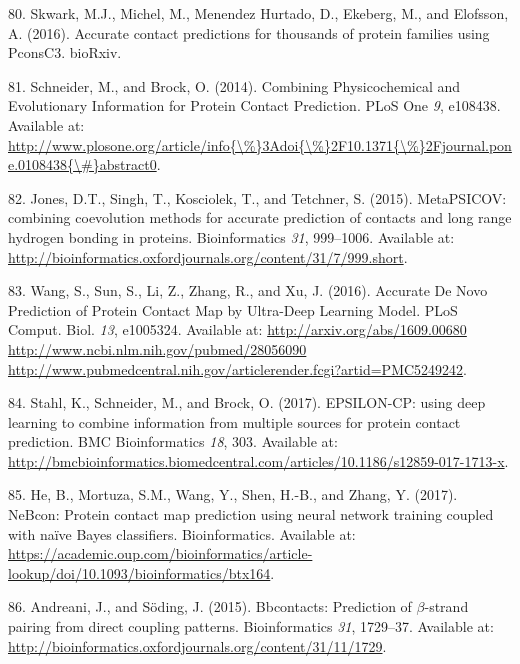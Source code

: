 \documentclass[11pt,a4paper,twoside]{book}
\theoremstyle{definition}
\theoremstyle{definition}
\theoremstyle{remark}
\begin{document}
\hypertarget{ref-Skwark2016}{}
80. Skwark, M.J., Michel, M., Menendez Hurtado, D., Ekeberg, M., and
Elofsson, A. (2016). Accurate contact predictions for thousands of
protein families using PconsC3. bioRxiv.

\hypertarget{ref-Schneider2014}{}
81. Schneider, M., and Brock, O. (2014). Combining Physicochemical and
Evolutionary Information for Protein Contact Prediction. PLoS One
\emph{9}, e108438. Available at:
\href{http://www.plosone.org/article/info\%7B/\%\%7D3Adoi\%7B/\%\%7D2F10.1371\%7B/\%\%7D2Fjournal.pone.0108438\%7B/\#\%7Dabstract0}{http://www.plosone.org/article/info\{\textbackslash{}\%\}3Adoi\{\textbackslash{}\%\}2F10.1371\{\textbackslash{}\%\}2Fjournal.pone.0108438\{\textbackslash{}\#\}abstract0}.

\hypertarget{ref-Jones2015a}{}
82. Jones, D.T., Singh, T., Kosciolek, T., and Tetchner, S. (2015).
MetaPSICOV: combining coevolution methods for accurate prediction of
contacts and long range hydrogen bonding in proteins. Bioinformatics
\emph{31}, 999--1006. Available at:
\url{http://bioinformatics.oxfordjournals.org/content/31/7/999.short}.

\hypertarget{ref-Wang2016a}{}
83. Wang, S., Sun, S., Li, Z., Zhang, R., and Xu, J. (2016). Accurate De
Novo Prediction of Protein Contact Map by Ultra-Deep Learning Model.
PLoS Comput. Biol. \emph{13}, e1005324. Available at:
\href{http://arxiv.org/abs/1609.00680\%20http://www.ncbi.nlm.nih.gov/pubmed/28056090\%20http://www.pubmedcentral.nih.gov/articlerender.fcgi?artid=PMC5249242}{http://arxiv.org/abs/1609.00680 http://www.ncbi.nlm.nih.gov/pubmed/28056090 http://www.pubmedcentral.nih.gov/articlerender.fcgi?artid=PMC5249242}.

\hypertarget{ref-Stahl2017}{}
84. Stahl, K., Schneider, M., and Brock, O. (2017). EPSILON-CP: using
deep learning to combine information from multiple sources for protein
contact prediction. BMC Bioinformatics \emph{18}, 303. Available at:
\url{http://bmcbioinformatics.biomedcentral.com/articles/10.1186/s12859-017-1713-x}.

\hypertarget{ref-He2017}{}
85. He, B., Mortuza, S.M., Wang, Y., Shen, H.-B., and Zhang, Y. (2017).
NeBcon: Protein contact map prediction using neural network training
coupled with naïve Bayes classifiers. Bioinformatics. Available at:
\url{https://academic.oup.com/bioinformatics/article-lookup/doi/10.1093/bioinformatics/btx164}.

\hypertarget{ref-Andreani2015a}{}
86. Andreani, J., and Söding, J. (2015). Bbcontacts: Prediction of
\(\beta\)-strand pairing from direct coupling patterns. Bioinformatics
\emph{31}, 1729--37. Available at:
\url{http://bioinformatics.oxfordjournals.org/content/31/11/1729}.
\end{document}

